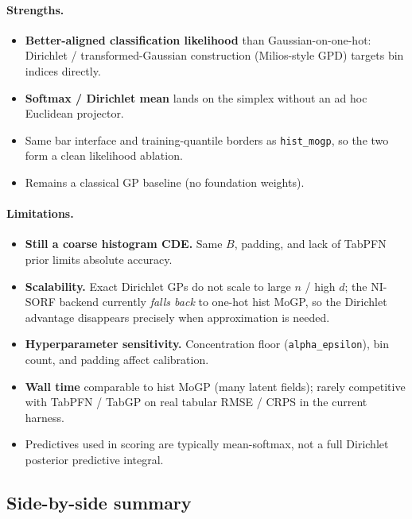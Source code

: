 \documentclass[11pt,a4paper]{article}
\theoremstyle{definition}
\begin{document}
\paragraph{Strengths.}
\begin{itemize}[leftmargin=1.2em,itemsep=2pt]
\item \textbf{Better-aligned classification likelihood} than Gaussian-on-one-hot:
  Dirichlet / transformed-Gaussian construction (Milios-style GPD) targets bin
  indices directly.
\item \textbf{Softmax / Dirichlet mean} lands on the simplex without an ad hoc
  Euclidean projector.
\item Same bar interface and training-quantile borders as \texttt{hist\_mogp}, so
  the two form a clean likelihood ablation.
\item Remains a classical GP baseline (no foundation weights).
\end{itemize}

\paragraph{Limitations.}
\begin{itemize}[leftmargin=1.2em,itemsep=2pt]
\item \textbf{Still a coarse histogram CDE.} Same $B$, padding, and lack of
  TabPFN prior limits absolute accuracy.
\item \textbf{Scalability.} Exact Dirichlet GPs do not scale to large $n$ / high
  $d$; the NI-SORF backend currently \emph{falls back} to one-hot hist MoGP, so
  the Dirichlet advantage disappears precisely when approximation is needed.
\item \textbf{Hyperparameter sensitivity.} Concentration floor
  (\texttt{alpha\_epsilon}), bin count, and padding affect calibration.
\item \textbf{Wall time} comparable to hist MoGP (many latent fields); rarely
  competitive with TabPFN / TabGP on real tabular RMSE / CRPS in the current
  harness.
\item Predictives used in scoring are typically mean-softmax, not a full
  Dirichlet posterior predictive integral.
\end{itemize}

\subsection{Side-by-side summary}
\end{document}
